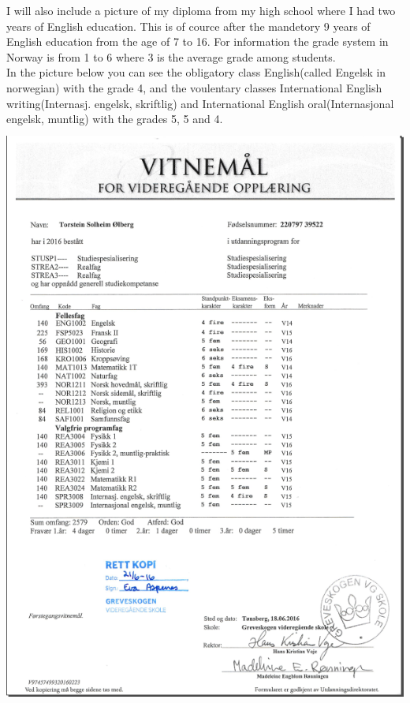 \documentclass[11pt, A4paper, norsk]{article}
\begin{document}
I will also include a picture of my diploma from my high school where I had two years of English education. This is of cource after the mandetory 9 years of English education from the age of 7 to 16. For information the grade system in Norway is from 1 to 6 where 3 is the average grade among students. \\
In the picture below you can see the obligatory class English(called Engelsk in norwegian) with the grade 4, and the voulentary classes International English writing(Internasj. engelsk, skriftlig) and International English oral(Internasjonal engelsk, muntlig) with the grades 5, 5 and 4. \\
\includegraphics[width=400pt, height=550pt]{Vitnemal.png}
\end{document}
